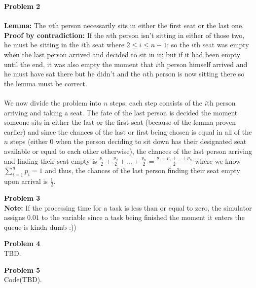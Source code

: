 \documentclass{article}
\newenvironment{problem}[2][Problem]
    { \begin{mdframed}[backgroundcolor=gray!20] \textbf{#1 #2} \\}
    {  \end{mdframed}}
\begin{document}
    \begin{problem}{2}
    	\\
    	\textbf{Lemma:} The $n$th person necessarily sits in either the first seat or the
    	last one. \\ \textbf{Proof by contradiction:} If the $n$th person isn't sitting in 
    	either of those two, he must be sitting in the $i$th seat where $2\leq i\leq n-1$;
    	so the $i$th seat was empty when the last person arrived and decided to sit in it;
    	but if it had been empty until the end, it was also empty the moment that $i$th person
    	himself arrived and he must have sat there but he didn't and the $n$th person is now
    	sitting there so the lemma must be correct. \\ \\
    	We now divide the problem into $n$ steps; each step consists of the $i$th person arriving 
    	and taking a seat. The fate of the last person is decided the moment someone sits
    	in either the last or the first seat (because of the lemma proven earlier) and since 
    	the chances of the last or first being chosen is equal in all of the $n$ 
    	steps (either $0$ when the person deciding to sit down has their designated seat available
    	or equal to each other otherwise), the chances of the last person arriving and finding 
    	their seat empty is $\displaystyle\frac{p_1}{2}+\frac{p_2}{2}+...+\frac{p_n}{2} = \frac{p_1+p_2+...+p_n}{2}$   where we know $\displaystyle\sum_{i=1}^{n}p_i=1$ and thus, the chances of the last person
    	finding their seat empty upon arrival is $\frac{1}{2}$.
    \end{problem}
    
    \begin{problem}{3}
    	\textbf{Note:} If the processing time for a task is less than or equal to zero, 
    	the simulator assigns $0.01$ to the variable since a task being finished the moment 
    	it enters the queue is kinda dumb :))
    \end{problem}
    
    \begin{problem}{4}
    	TBD.
    \end{problem}
    
    \begin{problem}{5}
    	Code(TBD).
    \end{problem}
    
\end{document}
